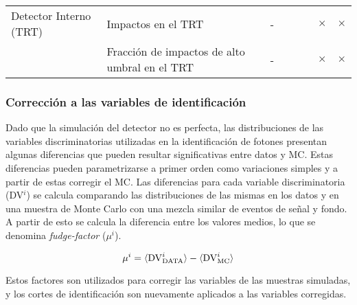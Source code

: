 \begin{table}[!htbp]
\begin{tabular}{y{3cm} p{7cm} c | cc | ccc}
  Detector Interno (TRT)           & Impactos en el TRT                                & -                       &  &   &   & $\times$ & $\times$ \\

                & Fracción de impactos de alto umbral en el TRT     & -                       &  &   &   & $\times$ & $\times$ \\
  \hline
  \end{tabular}

\end{table}



\subsubsection{Corrección a las variables de identificación}

Dado que la simulación del detector no es perfecta, las distribuciones de las variables
discriminatorias utilizadas en la identificación
de fotones presentan algunas diferencias que pueden resultar significativas entre datos y MC.
Estas diferencias pueden parametrizarse a primer orden como variaciones simples
y a partir de estas corregir el MC.
Las diferencias para cada variable discriminatoria (DV$^i$) se calcula
comparando las distribuciones de las mismas en los datos y en una muestra de
Monte Carlo con una mezcla similar de eventos de señal y fondo.
A partir de esto se calcula la diferencia
entre los valores medios, lo que se denomina \emph{fudge-factor} ($\mu^i$)\cite{ATLAS-CONF-2012-123}.

\begin{equation}
  \mu^i = \langle \mathrm{DV}^i_\text{DATA} \rangle - \langle \mathrm{DV}^i_\mathrm{MC} \rangle
\end{equation}

Estos factores son utilizados para corregir las variables de las
muestras simuladas, y los cortes de identificación son nuevamente
aplicados a las variables corregidas.


